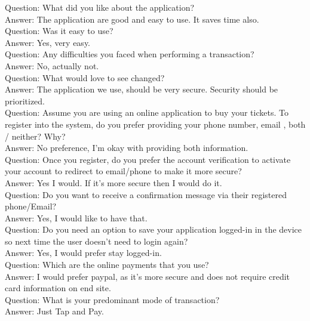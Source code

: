 \documentclass[11pt, english]{report}
\begin{document}
Question: What did you like about the application?\\
Answer: The application are good and easy to use. It saves time also.\\

Question: Was it easy to use?\\
Answer: Yes, very easy.\\

Question: Any difficulties you faced when performing a transaction?\\
Answer: No, actually not.\\

Question: What would love to see changed?\\
Answer: The application we use, should be very secure. Security should be prioritized.\\

Question: Assume you are using an online application to buy your tickets. To register into the system, do you prefer providing your phone number, email , both / neither? Why?\\
Answer: No preference, I'm okay with providing both information.\\
 
Question: Once you register, do you prefer the account verification to activate your account to redirect to email/phone to make it more secure?\\
Answer: Yes I would. If it’s more secure then I would do it.\\
 
Question: Do you want to receive a confirmation message via their registered phone/Email?\\
Answer: Yes, I would like to have that.\\
 
Question: Do you  need an option to save your application logged-in in the device so next time the user doesn’t need to login again?\\
Answer: Yes, I would prefer stay logged-in.\\

Question: Which are the online payments that you use?\\
Answer: I would prefer paypal, as it's more secure and does not require credit card information on end site.\\
 
Question: What is your predominant mode of transaction?\\
Answer: Just Tap and Pay.\\
 
\end{document}
